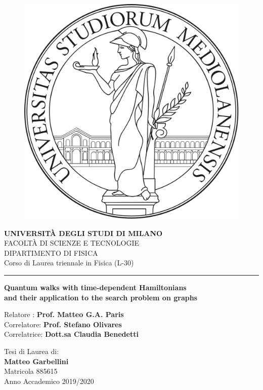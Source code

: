 \begin{titlepage}
    \begin{center}
        \begin{figure}[hbt!]
             \centering
             \includegraphics[width=0.3 \textwidth]{./figures/unimi_logo_tesi}
        \end{figure}
        \textbf{\Large{UNIVERSIT\`A DEGLI STUDI DI MILANO}}\\
        \vspace{12pt}
        \Large{FACOLT\`A DI SCIENZE E TECNOLOGIE}\\
        \Large{DIPARTIMENTO DI FISICA}\\
        \Large{Corso di Laurea triennale in Fisica (L-30)}
        \vspace{24pt}
        \hrule
        \vspace{24pt}
        \textbf{\large{Quantum walks with time-dependent Hamiltonians\\ and their application to the search problem on graphs}} \\

    \end{center}
    \vspace{120pt}
    \begin{flushleft}
        Relatore : \textbf{Prof. Matteo G.A. Paris}\\
        Correlatore: \textbf{Prof. Stefano Olivares}\\
        Correlatrice: \textbf{Dott.sa Claudia Benedetti}
    \end{flushleft}
    \vspace{12pt}
    \begin{flushright}
        Tesi di Laurea di:\\
        \textbf{Matteo Garbellini}\\
        Matricola 885615\\
        Anno Accademico 2019/2020
    \end{flushright}
\end{titlepage}
\newpage
